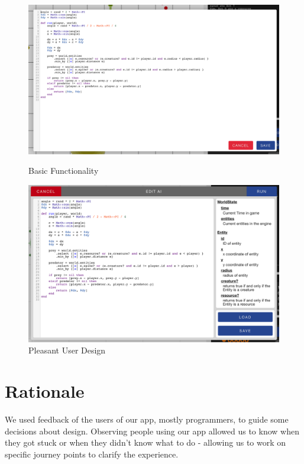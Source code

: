 \documentclass[a4paper, 6pt]{article}
\begin{document}
\begin{figure}[ht!]
\includegraphics[width=\linewidth]{editor_01.png}
\caption{Basic Functionality}
\endminipage\hfill
{}
\includegraphics[width=\linewidth]{editor_02.png}
\caption{Pleasant User Design}
\endminipage\hfill
\end{figure}

\section{Rationale}
\label{sec:Rationale}
We used feedback of the users of our app, mostly programmers, to guide some decisions about design. Observing people using our app allowed us to know when they got stuck or when they didn't know what to do - allowing us to work on specific journey points to clarify the experience.
\end{document}
